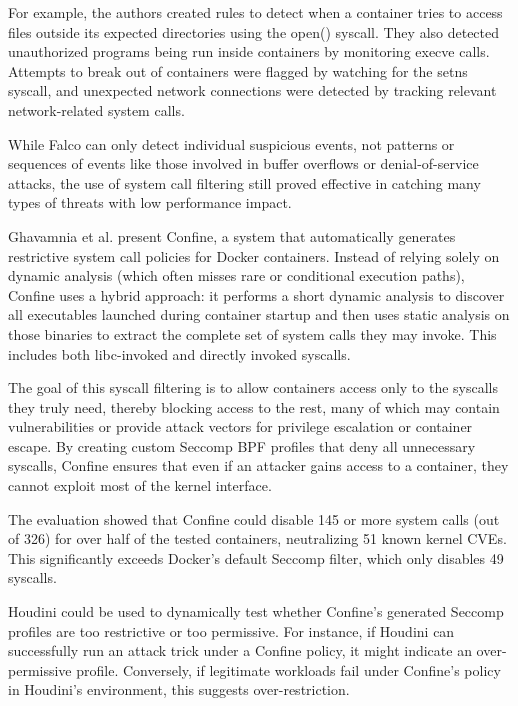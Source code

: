 \documentclass[12pt]{report}
\begin{document}
\begin{doublespace}
For example, the authors created rules to detect when a container tries to access files outside its expected directories using the open() syscall. They also detected unauthorized programs being run inside containers by monitoring execve calls. Attempts to break out of containers were flagged by watching for the setns syscall, and unexpected network connections were detected by tracking relevant network-related system calls.

While Falco can only detect individual suspicious events, not patterns or sequences of events like those involved in buffer overflows or denial-of-service attacks, the use of system call filtering still proved effective in catching many types of threats with low performance impact.

Ghavamnia et al. \cite{ghavamnia2020confine} present Confine, a system that automatically generates restrictive system call policies for Docker containers. Instead of relying solely on dynamic analysis (which often misses rare or conditional execution paths), Confine uses a hybrid approach: it performs a short dynamic analysis to discover all executables launched during container startup and then uses static analysis on those binaries to extract the complete set of system calls they may invoke. This includes both libc-invoked and directly invoked syscalls.

The goal of this syscall filtering is to allow containers access only to the syscalls they truly need, thereby blocking access to the rest, many of which may contain vulnerabilities or provide attack vectors for privilege escalation or container escape. By creating custom Seccomp BPF profiles that deny all unnecessary syscalls, Confine ensures that even if an attacker gains access to a container, they cannot exploit most of the kernel interface.

The evaluation showed that Confine could disable 145 or more system calls (out of 326) for over half of the tested containers, neutralizing 51 known kernel CVEs. This significantly exceeds Docker’s default Seccomp filter, which only disables 49 syscalls.

Houdini could be used to dynamically test whether Confine’s generated Seccomp profiles are too restrictive or too permissive. For instance, if Houdini can successfully run an attack trick under a Confine policy, it might indicate an over-permissive profile. Conversely, if legitimate workloads fail under Confine’s policy in Houdini’s environment, this suggests over-restriction.


\end{doublespace}
\end{document}
